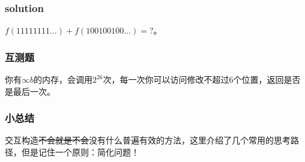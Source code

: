 \documentclass[10pt]{beamer}
\begin{document}
	\clearpage
	\begin{frame}
		\frametitle{solution}
	
		$f(11111111\dots)+f(100100100\dots)=?$。
	
	\end{frame}
	\clearpage
	\begin{frame}
		\frametitle{互测题}
	
		你有$\infty b$的内存，会调用$2^{26}$次，每一次你可以访问修改不超过$6$个位置，返回是否是最后一次。
	
	\end{frame}
	\clearpage
	\begin{frame}
		\frametitle{小总结}

		交互构造\sout{不会就是不会}没有什么普遍有效的方法，这里介绍了几个常用的思考路径，但是记住一个原则：简化问题！

	\end{frame}
\end{document}
